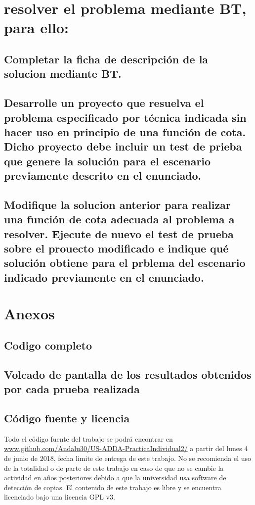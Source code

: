 \documentclass[a4paper,12pt]{article}
\begin{document}
\section{resolver el problema mediante BT, para ello:}
\subsection{Completar la ficha de descripción de la solucion mediante BT.}
\subsection{Desarrolle un proyecto que resuelva el problema especificado por técnica indicada sin hacer uso en principio de una función de cota. Dicho proyecto debe incluir un test de prieba que genere la solución para el escenario previamente descrito en el enunciado.}
\subsection{Modifique la solucion anterior para realizar una función de cota adecuada al problema a resolver. Ejecute de nuevo el test de prueba sobre el prouecto modificado e indique qué solución obtiene para el prblema del escenario indicado previamente en el enunciado.}


\section{Anexos}
\subsection{Codigo completo}
\subsection{Volcado de pantalla de los resultados obtenidos por cada prueba realizada}
\subsection{Código fuente y licencia}
Todo el código fuente del trabajo se podrá encontrar en \url{www.github.com/Andalu30/US-ADDA-PracticaIndividual2/}
a partir del lunes 4 de junio de 2018, fecha limite de entrega de este trabajo.
No se recomienda el uso de la totalidad o de parte de este trabajo en caso de que no se cambie la actividad en años posteriores debido a que la universidad usa software de detección de copias.
El contenido de este trabajo es libre y se encuentra licenciado bajo una licencia GPL v3.\\
\end{document}

